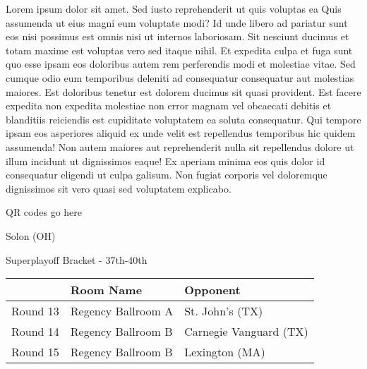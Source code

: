 \documentclass{article}%
\begin{document}
\vspace*{8pt}%
\linebreak%
\newline%
\newline%
Lorem ipsum dolor sit amet. Sed iusto reprehenderit ut quis voluptas ea Quis assumenda ut eius magni eum voluptate modi? Id unde libero ad pariatur sunt eos nisi possimus est omnis nisi ut internos laboriosam. Sit nesciunt ducimus et totam maxime est voluptas vero sed itaque nihil. Et expedita culpa et fuga sunt quo esse ipsam eos doloribus autem rem perferendis modi et molestiae vitae.\newline%
\newline%
Sed cumque odio eum temporibus deleniti ad consequatur consequatur aut molestias maiores. Est doloribus tenetur est dolorem ducimus sit quasi provident. Est facere expedita non expedita molestiae non error magnam vel obcaecati debitis et blanditiis reiciendis est cupiditate voluptatem ea soluta consequatur. Qui tempore ipsam eos asperiores aliquid ex unde velit est repellendus temporibus hic quidem assumenda!\newline%
\newline%
Non autem maiores aut reprehenderit nulla sit repellendus dolore ut illum incidunt ut dignissimos eaque! Ex aperiam minima eos quis dolor id consequatur eligendi ut culpa galisum. Non fugiat corporis vel doloremque dignissimos sit vero quasi sed voluptatem explicabo.\newline%
\newline%
%
\vspace*{30pt}%
\begin{center}%
\begin{Huge}%
QR codes go here%
\end{Huge}%
\end{center}%
\newpage%
\begin{center}%
\begin{Huge}%
Solon (OH)%
\end{Huge}%
\vspace*{8pt}%
\linebreak%
\begin{Large}%
Superplayoff Bracket {-} 37th{-}40th%
\end{Large}%
\end{center}%
%
\begin{tabularx}{\textwidth}{|c|Y|Y|}%
\hline%
&Room Name&Opponent\\%
\hline%
Round 13&Regency Ballroom A&St. John's (TX)\\%
Round 14&Regency Ballroom B&Carnegie Vanguard (TX)\\%
Round 15&Regency Ballroom B&Lexington (MA)\\%
\hline%
\end{tabularx}%
\end{document}
